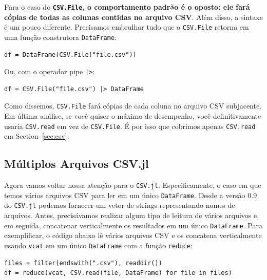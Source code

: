 \documentclass[
  notoc %
]{tufte-book}
\newcommand{\passthrough}[1]{#1}
\begin{document}
Para o caso do \textbf{\passthrough{\lstinline!CSV.File!}, o
comportamento padrão é o oposto: ele fará cópias de todas as colunas
contidas no arquivo CSV}. Além disso, a sintaxe é um pouco diferente.
Precisamos embrulhar tudo que o \passthrough{\lstinline!CSV.File!}
retorna em uma função construtora \passthrough{\lstinline!DataFrame!}:

\begin{lstlisting}
df = DataFrame(CSV.File("file.csv"))
\end{lstlisting}

Ou, com o operador pipe \passthrough{\lstinline!|>!}:

\begin{lstlisting}
df = CSV.File("file.csv") |> DataFrame
\end{lstlisting}

Como dissemos, \passthrough{\lstinline!CSV.File!} fará cópias de cada
coluna no arquivo CSV subjacente. Em última análise, se você quiser o
máximo de desempenho, você definitivamente usaria
\passthrough{\lstinline!CSV.read!} em vez de
\passthrough{\lstinline!CSV.File!}. É por isso que cobrimos apenas
\passthrough{\lstinline!CSV.read!} em Section~\ref{sec:csv}.

\hypertarget{sec:df_performance_csv_multiple}{%
\subsection{Múltiplos Arquivos
CSV.jl}\label{sec:df_performance_csv_multiple}}

Agora vamos voltar nossa atenção para o
\passthrough{\lstinline!CSV.jl!}. Especificamente, o caso em que temos
vários arquivos CSV para ler em um único
\passthrough{\lstinline!DataFrame!}. Desde a versão 0.9 do
\passthrough{\lstinline!CSV.jl!} podemos fornecer um vetor de strings
representando nomes de arquivos. Antes, precisávamos realizar algum tipo
de leitura de vários arquivos e, em seguida, concatenar verticalmente os
resultados em um único \passthrough{\lstinline!DataFrame!}. Para
exemplificar, o código abaixo lê vários arquivos CSV e os concatena
verticalmente usando \passthrough{\lstinline!vcat!} em um único
\passthrough{\lstinline!DataFrame!} com a função
\passthrough{\lstinline!reduce!}:

\begin{lstlisting}
files = filter(endswith(".csv"), readdir())
df = reduce(vcat, CSV.read(file, DataFrame) for file in files)
\end{lstlisting}
\end{document}
